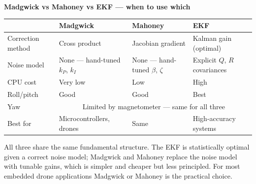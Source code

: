 \documentclass[12pt, a4paper]{article}
\begin{document}
\begin{notebox}
  \textbf{Madgwick vs Mahoney vs EKF --- when to use which}

  \medskip
  \begin{tabular}{@{} p{2.4cm} p{3.2cm} p{3.2cm} p{3.0cm} @{}}
    \toprule
    & \textbf{Madgwick} & \textbf{Mahoney} & \textbf{EKF} \\
    \midrule
    Correction method &
      Cross product &
      Jacobian gradient &
      Kalman gain (optimal) \\[4pt]
    Noise model &
      None --- hand-tuned $k_P$, $k_I$ &
      None --- hand-tuned $\beta$, $\zeta$ &
      Explicit $Q$, $R$ covariances \\[4pt]
    CPU cost &
      Very low &
      Low &
      High \\[4pt]
    Roll/pitch &
      Good &
      Good &
      Best \\[4pt]
    Yaw &
      \multicolumn{3}{c}{Limited by magnetometer --- same for all three} \\[4pt]
    Best for &
      Microcontrollers, drones &
      Same &
      High-accuracy systems \\
    \bottomrule
  \end{tabular}

  \medskip
  All three share the same fundamental structure.
  The EKF is statistically optimal given a correct noise model;
  Madgwick and Mahoney replace the noise model with tunable gains,
  which is simpler and cheaper but less principled.
  For most embedded drone applications Madgwick or Mahoney is the
  practical choice.
\end{notebox}
\end{document}
